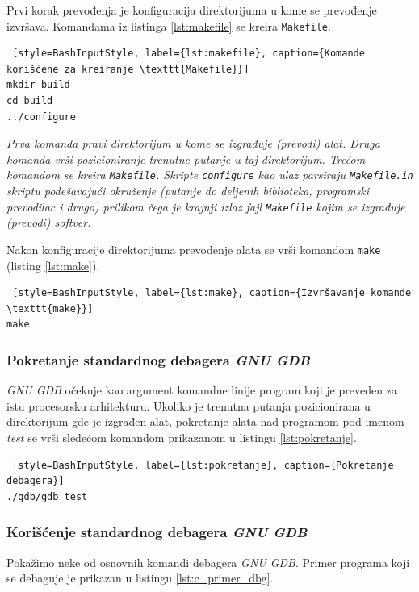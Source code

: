 \documentclass[12pt,oneside]{memoir}
\begin{document}
Prvi korak prevođenja je konfiguracija direktorijuma u kome se prevođenje izvršava. Komandama iz listinga \ref{lst:makefile} se kreira \texttt{Makefile}.
\begin{lstlisting} [style=BashInputStyle, label={lst:makefile}, caption={Komande korišćene za kreiranje \texttt{Makefile}}]
mkdir build
cd build
../configure

\end{lstlisting}
\emph{Prva komanda pravi direktorijum u kome se izgrađuje (prevodi) alat. Druga komanda vrši pozicioniranje trenutne putanje u taj direktorijum. Trećom komandom se kreira \texttt{Makefile}. Skripte \texttt{configure} kao ulaz parsiraju \texttt{Makefile.in} skriptu podešavajući okruženje (putanje do deljenih biblioteka, programski prevodilac i drugo) prilikom čega je krajnji izlaz fajl \texttt{Makefile} kojim se izgrađuje (prevodi) softver.}

Nakon konfiguracije direktorijuma prevođenje alata se vrši komandom \texttt{make} (listing \ref{lst:make}).
\begin{lstlisting} [style=BashInputStyle, label={lst:make}, caption={Izvršavanje komande \texttt{make}}]
make
\end{lstlisting}

\subsubsection{Pokretanje standardnog debagera \emph{GNU GDB}}

\emph{GNU GDB} očekuje kao argument komandne linije program koji je preveden za istu procesorsku arhitekturu. Ukoliko je trenutna putanja pozicionirana u direktorijum gde je izgrađen alat, pokretanje alata nad programom pod imenom \emph{test} se vrši sledećom komandom prikazanom u listingu \ref{lst:pokretanje}.
\begin{lstlisting} [style=BashInputStyle, label={lst:pokretanje}, caption={Pokretanje debagera}]
./gdb/gdb test

\end{lstlisting}


\subsubsection{Korišćenje standardnog debagera \emph{GNU GDB}}

Pokažimo neke od osnovnih komandi debagera \emph{GNU GDB}.
Primer programa koji se debaguje je prikazan u listingu \ref{lst:c_primer_dbg}.\newpage
\end{document}
